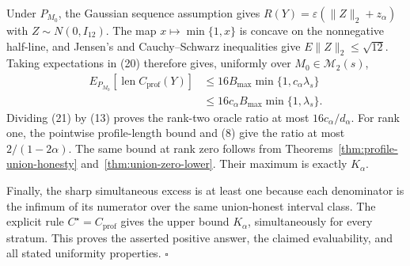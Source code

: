 Under \(P_{M_0}\), the Gaussian sequence assumption gives \(R(Y)=\varepsilon(\lVert Z\rVert_2+z_\alpha)\) with \(Z\sim N(0,I_{12})\).  The map \(x\mapsto\min\{1,x\}\) is concave on the nonnegative half-line, and Jensen's and Cauchy--Schwarz inequalities give \(E\lVert Z\rVert_2\leq\sqrt{12}\).  Taking expectations in (20) therefore gives, uniformly over \(M_0\in\mathcal M_2(s)\),
\[
 \begin{split}
 E_{P_{M_0}}[\operatorname{len}C_{\mathrm{prof}}(Y)]
 &\leq16B_{\max}\min\{1,c_\alpha\lambda_s\}\\
 &\leq16c_\alpha B_{\max}\min\{1,\lambda_s\}.
 \end{split}
\tag{21}
\]
Dividing (21) by (13) proves the rank-two oracle ratio at most \(16c_\alpha/d_\alpha\).  For rank one, the pointwise profile-length bound and (8) give the ratio at most \(2/(1-2\alpha)\).  The same bound at rank zero follows from Theorems~\ref{thm:profile-union-honesty} and~\ref{thm:union-zero-lower}.  Their maximum is exactly \(K_\alpha\).

Finally, the sharp simultaneous excess is at least one because each denominator is the infimum of its numerator over the same union-honest interval class.  The explicit rule \(C^\star=C_{\mathrm{prof}}\) gives the upper bound \(K_\alpha\), simultaneously for every stratum.  This proves the asserted positive answer, the claimed evaluability, and all stated uniformity properties. \(\square\)
